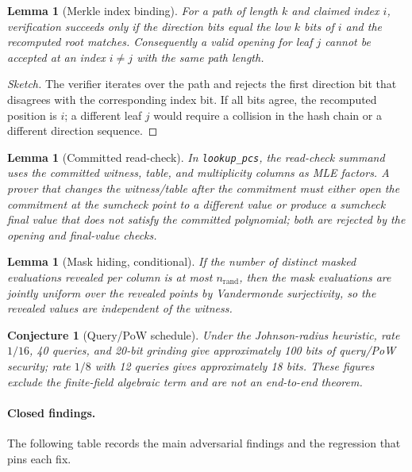 \documentclass[11pt,a4paper]{article}
\newtheorem{lemma}[theorem]{Lemma}
\newtheorem{conjecture}[theorem]{Conjecture}
\begin{document}
\begin{lemma}[Merkle index binding]
For a path of length $k$ and claimed index $i$, verification succeeds only if
the direction bits equal the low $k$ bits of $i$ and the recomputed root
matches. Consequently a valid opening for leaf $j$ cannot be accepted at an
index $i\ne j$ with the same path length.
\end{lemma}
\begin{proof}[Sketch]
The verifier iterates over the path and rejects the first direction bit that
disagrees with the corresponding index bit. If all bits agree, the recomputed
position is $i$; a different leaf $j$ would require a collision in the hash
chain or a different direction sequence.
\end{proof}

\begin{lemma}[Committed read-check]
In \texttt{lookup\_pcs}, the read-check summand uses the committed witness,
table, and multiplicity columns as MLE factors. A prover that changes the
witness/table after the commitment must either open the commitment at the
sumcheck point to a different value or produce a sumcheck final value that
does not satisfy the committed polynomial; both are rejected by the opening
and final-value checks.
\end{lemma}

\begin{lemma}[Mask hiding, conditional]
If the number of distinct masked evaluations revealed per column is at most
$n_{\mathrm{rand}}$, then the mask evaluations are jointly uniform over the
revealed points by Vandermonde surjectivity, so the revealed values are
independent of the witness.
\end{lemma}

\begin{conjecture}[Query/PoW schedule]
Under the Johnson-radius heuristic, rate $1/16$, 40 queries, and 20-bit
grinding give approximately 100 bits of query/PoW security; rate $1/8$ with
12 queries gives approximately 18 bits. These figures exclude the
finite-field algebraic term and are not an end-to-end theorem.
\end{conjecture}

\paragraph{Closed findings.} The following table records the main
adversarial findings and the regression that pins each fix.
\end{document}
